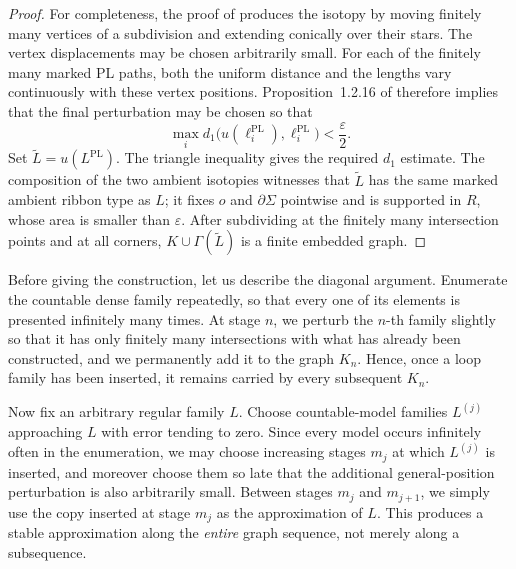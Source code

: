 \documentclass[11pt,a4paper,reqno]{article}
\theoremstyle{definition}
\theoremstyle{remark}
\begin{document}
\begin{proof}
For completeness, the proof of \cite[Theorem~5.3]{RourkeSandersonPL} produces the isotopy by moving finitely many vertices of a subdivision and extending conically over their stars. The vertex displacements may be chosen arbitrarily small. For each of the finitely many marked PL paths, both the uniform distance and the lengths vary continuously with these vertex positions. Proposition~1.2.16 of \cite{Lev10} therefore implies that the final perturbation may be chosen so that
\[
 \max_i d_1\bigl(u(\ell_i^{\mathrm{PL}}),\ell_i^{\mathrm{PL}}\bigr)
 <\frac{\varepsilon}{2}.
\]
Set $\widetilde L=u(L^{\mathrm{PL}})$. The triangle inequality gives the required $d_1$ estimate. The composition of the two ambient isotopies witnesses that $\widetilde L$ has the same marked ambient ribbon type as $L$; it fixes $o$ and $\partial\Sigma$ pointwise and is supported in $R$, whose area is smaller than $\varepsilon$. After subdividing at the finitely many intersection points and at all corners, $K\cup\Gamma(\widetilde L)$ is a finite embedded graph.
\end{proof}

Before giving the construction, let us describe the diagonal argument. Enumerate the countable dense family repeatedly, so that every one of its elements is presented infinitely many times. At stage $n$, we perturb the $n$-th family slightly so that it has only finitely many intersections with what has already been constructed, and we permanently add it to the graph $K_n$. Hence, once a loop family has been inserted, it remains carried by every subsequent $K_n$.

Now fix an arbitrary regular family $L$. Choose countable-model families $L^{(j)}$ approaching $L$ with error tending to zero. Since every model occurs infinitely often in the enumeration, we may choose increasing stages $m_j$ at which $L^{(j)}$ is inserted, and moreover choose them so late that the additional general-position perturbation is also arbitrarily small. Between stages $m_j$ and $m_{j+1}$, we simply use the copy inserted at stage $m_j$ as the approximation of $L$. This produces a stable approximation along the \emph{entire} graph sequence, not merely along a subsequence.
\end{document}
